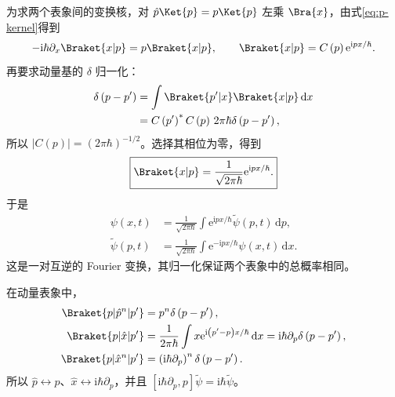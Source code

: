 为求两个表象间的变换核，对 $\hat p\Ket{p}=p\Ket{p}$ 左乘 $\Bra{x}$，由式\eqref{eq:p-kernel}得到
\begin{equation}
-\mathrm{i}\hbar\partial_x\Braket{x|p}=p\Braket{x|p},
\qquad \Braket{x|p}=C\left(p\right)\mathrm{e}^{\mathrm{i}px/\hbar}.
\end{equation}
再要求动量基的 $\delta$ 归一化：
\begin{align}
\delta\left(p-p'\right)&=\int\Braket{p'|x}\Braket{x|p}\,\mathrm{d}x\\
&=C\left(p'\right)^*C\left(p\right)\,2\pi\hbar\delta\left(p-p'\right),
\end{align}
所以 $\left|C\left(p\right)\right|=\left(2\pi\hbar\right)^{-1/2}$。选择其相位为零，得到
\begin{equation}
\boxed{\Braket{x|p}=\frac{1}{\sqrt{2\pi\hbar}}\mathrm{e}^{\mathrm{i}px/\hbar}.}
\end{equation}
于是
\begin{align}
\psi\left(x,t\right)&=\frac{1}{\sqrt{2\pi\hbar}}\int
\mathrm{e}^{\mathrm{i}px/\hbar}\widetilde\psi\left(p,t\right)\,\mathrm{d}p,\\
\widetilde\psi\left(p,t\right)&=\frac{1}{\sqrt{2\pi\hbar}}\int
\mathrm{e}^{-\mathrm{i}px/\hbar}\psi\left(x,t\right)\,\mathrm{d}x.
\label{eq:fourier-pair}
\end{align}
这是一对互逆的 Fourier 变换，其归一化保证两个表象中的总概率相同。

在动量表象中，
\begin{align}
\Braket{p|\hat p^n|p'}&=p^n\delta\left(p-p'\right),\\
\Braket{p|\hat x|p'}&=\frac{1}{2\pi\hbar}\int
x\mathrm{e}^{\mathrm{i}\left(p'-p\right)x/\hbar}\,\mathrm{d}x
=\mathrm{i}\hbar\partial_p\delta\left(p-p'\right),\\
\Braket{p|\hat x^n|p'}&=\left(\mathrm{i}\hbar\partial_p\right)^n\delta\left(p-p'\right).
\end{align}
所以 $\hat p\leftrightarrow p$、$\hat x\leftrightarrow\mathrm{i}\hbar\partial_p$，并且
$\left[\mathrm{i}\hbar\partial_p,p\right]\widetilde\psi=\mathrm{i}\hbar\widetilde\psi$。

